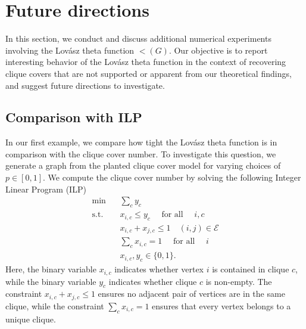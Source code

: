 

\section{Future directions} \label{sec:numerical}

In this section, we conduct and discuss additional numerical experiments involving the Lov\'asz theta function $\lt(G)$.  Our objective is to report interesting behavior of the Lov\'asz theta function in the context of recovering clique covers that are not supported or apparent from our theoretical findings, and suggest future directions to investigate.

\subsection{Comparison with ILP}

In our first example, we compare how tight the Lov\'asz theta function is in comparison with the clique cover number.  To investigate this question, we generate a graph from the planted clique cover model for varying choices of $p \in [0,1]$.  We compute the clique cover number by solving the following Integer Linear Program (ILP)
\begin{equation} \label{eq:cliquecover_ilp}
\begin{aligned}
\min ~~ & ~~ \sum_{c} y_c \\
\mathrm{s.t.} ~~ & ~~ x_{i,c} \leq y_c \quad \text{ for all } \quad i,c \\
& ~~ x_{i,c} + x_{j,c} \leq 1 \quad (i,j) \in \mathcal{E} \\
& ~~ \sum_{c} x_{i,c} = 1 \quad \text{ for all } \quad i \\
& ~~ x_{i,c}, y_c \in \{0,1\}.
\end{aligned}
\end{equation}
Here, the binary variable $x_{i,c}$ indicates whether vertex $i$ is contained in clique $c$, while the binary variable $y_c$ indicates whether clique $c$ is non-empty.  The constraint $x_{i,c} + x_{j,c} \leq 1$ ensures no adjacent pair of vertices are in the same clique, while the constraint $\sum_{c} x_{i,c} = 1$ ensures that every vertex belongs to a unique clique. %

